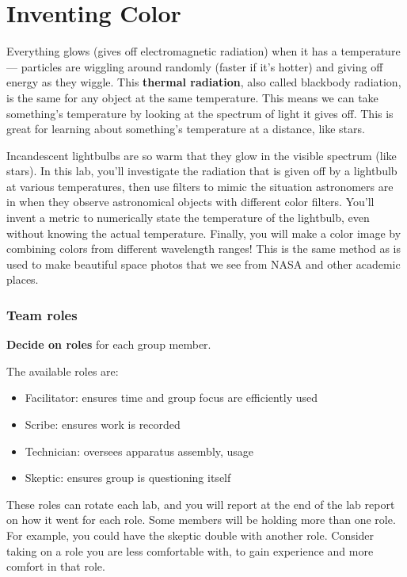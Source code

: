 \chapter{Inventing Color}

Everything glows (gives off electromagnetic radiation) when it has a temperature --- particles are wiggling around randomly (faster if it's hotter) and giving off energy as they wiggle. This \textbf{thermal radiation}, also called blackbody radiation, is the same for any object at the same temperature. This means we can take something's temperature by looking at the spectrum of light it gives off. This is great for learning about something's temperature at a distance, like stars.

Incandescent lightbulbs are so warm that they glow in the visible spectrum (like stars). In this lab, you'll investigate the radiation that is given off by a lightbulb at various temperatures, then use filters to mimic the situation astronomers are in when they observe astronomical objects with different color filters. You'll invent a metric to numerically state the temperature of the lightbulb, even without knowing the actual temperature. Finally, you will make a color image by combining colors from different wavelength
ranges!  This is the same method as is used to make beautiful space photos that
we see from NASA and other academic places.

\subsection{Team roles}

\begin{steps}
	\item \textbf{Decide on roles} for each group member.
\end{steps}

The available roles are:
\begin{itemize}
	\item Facilitator: ensures time and group focus are efficiently used
	\item Scribe: ensures work is recorded
	\item Technician: oversees apparatus assembly, usage
	\item Skeptic: ensures group is questioning itself
\end{itemize}

These roles can rotate each lab, and you will report at the end of the lab report on how it went for each role. Some members will be holding more than one role. For example, you could have the skeptic double with another role. Consider taking on a role you are less comfortable with, to gain experience and more comfort in that role.

